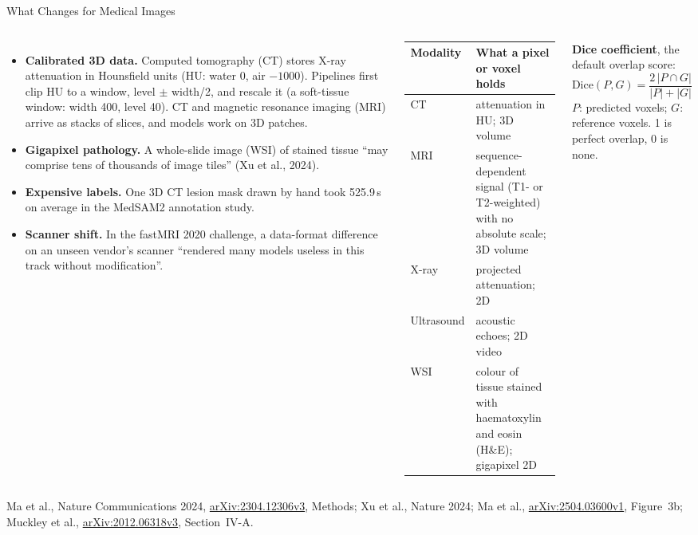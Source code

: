 \begin{frame}{What Changes for Medical Images}
  \begin{columns}[T,onlytextwidth]
      \begin{itemize}\footnotesize\itemsep0.35em
        \item \textbf{Calibrated 3D data.} Computed tomography (CT) stores X-ray attenuation in Hounsfield units (HU: water 0, air $-1000$). Pipelines first clip HU to a window, level $\pm$ width/2, and rescale it (a soft-tissue window: width 400, level 40). CT and magnetic resonance imaging (MRI) arrive as stacks of slices, and models work on 3D patches.
        \item \textbf{Gigapixel pathology.} A whole-slide image (WSI) of stained tissue ``may comprise tens of thousands of image tiles'' (Xu et al., 2024).
        \item \textbf{Expensive labels.} One 3D CT lesion mask drawn by hand took 525.9\,s on average in the MedSAM2 annotation study.
        \item \textbf{Scanner shift.} In the fastMRI 2020 challenge, a data-format difference on an unseen vendor's scanner ``rendered many models useless in this track without modification''.
      \end{itemize}
      \centering
      {\scriptsize
      \begin{tabular}{@{}>{\raggedright\arraybackslash}p{1.3cm} >{\raggedright\arraybackslash}p{4.4cm}@{}}
        \toprule
        \textbf{Modality} & \textbf{What a pixel or voxel holds} \\
        \midrule
        CT & attenuation in HU; 3D volume \\
        MRI & sequence-dependent signal (T1- or T2-weighted) with no absolute scale; 3D volume \\
        X-ray & projected attenuation; 2D \\
        Ultrasound & acoustic echoes; 2D video \\
        WSI & colour of tissue stained with haematoxylin and eosin (H\&E); gigapixel 2D \\
        \bottomrule
      \end{tabular}\par}
      \vspace{0.5em}
      \begin{tcolorbox}[colframe=KAred, colback=gray!6, boxrule=0.5pt, left=4pt, right=4pt, top=3pt, bottom=3pt]
        \footnotesize \textbf{Dice coefficient}, the default overlap score:
        \[ \mathrm{Dice}(P,G) = \frac{2\,|P \cap G|}{|P| + |G|} \]
        $P$: predicted voxels; $G$: reference voxels. 1 is perfect overlap, 0 is none.
      \end{tcolorbox}
  \end{columns}
  {\scriptsize Ma et al., Nature Communications 2024, \href{https://arxiv.org/abs/2304.12306v3}{arXiv:2304.12306v3}, Methods; Xu et al., Nature 2024; Ma et al., \href{https://arxiv.org/abs/2504.03600v1}{arXiv:2504.03600v1}, Figure~3b; Muckley et al., \href{https://arxiv.org/abs/2012.06318v3}{arXiv:2012.06318v3}, Section~IV-A.\par}
\end{frame}

